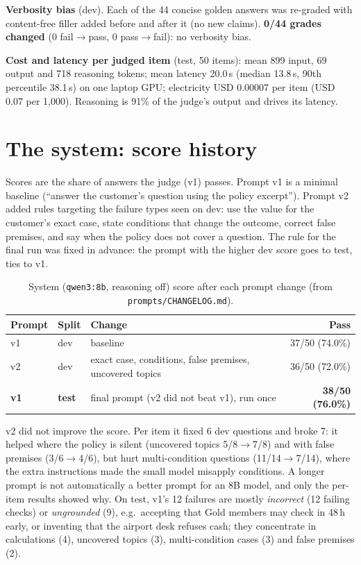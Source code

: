 \documentclass[10pt,a4paper]{article}
\newcommand{\code}[1]{\texttt{#1}}
\begin{document}
\textbf{Verbosity bias} (dev). Each of the 44 concise golden answers was re-graded with content-free filler added before and after it (no new claims). \textbf{0/44 grades changed} (0 fail$\to$pass, 0 pass$\to$fail): no verbosity bias.

\textbf{Cost and latency per judged item} (test, 50 items): mean 899 input, 69 output and 718 reasoning tokens; mean latency 20.0\,s (median 13.8\,s, 90th percentile 38.1\,s) on one laptop GPU; electricity USD 0.00007 per item (USD 0.07 per 1{,}000). Reasoning is 91\% of the judge's output and drives its latency.

\section{The system: score history}

Scores are the share of answers the judge (v1) passes. Prompt v1 is a minimal baseline (``answer the customer's question using the policy excerpt''). Prompt v2 added rules targeting the failure types seen on dev: use the value for the customer's exact case, state conditions that change the outcome, correct false premises, and say when the policy does not cover a question. The rule for the final run was fixed in advance: the prompt with the higher dev score goes to test, ties to v1.

\begin{table}[htbp]
\centering\small
\begin{tabularx}{\linewidth}{@{}llXr@{}}
\toprule
Prompt & Split & Change & Pass \\
\midrule
v1 & dev & baseline & 37/50 (74.0\%) \\
v2 & dev & exact case, conditions, false premises, uncovered topics & 36/50 (72.0\%) \\
\textbf{v1} & \textbf{test} & final prompt (v2 did not beat v1), run once & \textbf{38/50 (76.0\%)} \\
\bottomrule
\end{tabularx}
\caption{System (\code{qwen3:8b}, reasoning off) score after each prompt change (from \code{prompts/CHANGELOG.md}).}
\label{tab:system}
\end{table}

v2 did not improve the score. Per item it fixed 6 dev questions and broke 7: it helped where the policy is silent (uncovered topics 5/8$\to$7/8) and with false premises (3/6$\to$4/6), but hurt multi-condition questions (11/14$\to$7/14), where the extra instructions made the small model misapply conditions. A longer prompt is not automatically a better prompt for an 8B model, and only the per-item results showed why. On test, v1's 12 failures are mostly \emph{incorrect} (12 failing checks) or \emph{ungrounded} (9), e.g.\ accepting that Gold members may check in 48\,h early, or inventing that the airport desk refuses cash; they concentrate in calculations (4), uncovered topics (3), multi-condition cases (3) and false premises (2).
\end{document}
